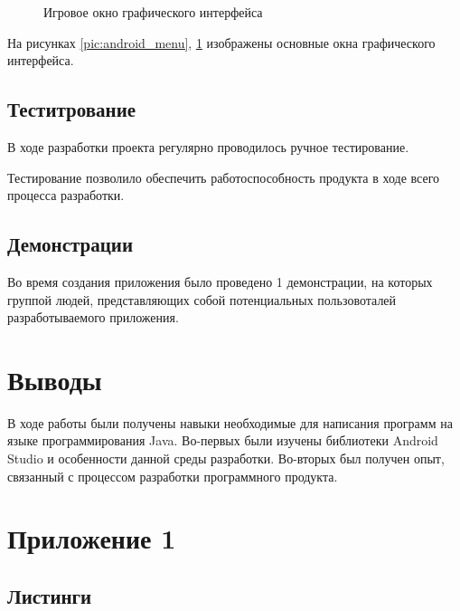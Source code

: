 	\begin{figure}[H]
		\begin{center}
			\caption{Игровое окно графического интерфейса}
			\label{pic:android_screen1}
		\end{center}
	\end{figure} 
	
	На рисунках \ref{pic:android_menu}, \ref{pic:android_screen1} изображены основные окна графического интерфейса. 
	
	\subsection{Теститрование}
	
	В ходе разработки проекта регулярно проводилось ручное тестирование.
	
	Тестирование позволило обеспечить работоспособность продукта в ходе всего процесса разработки. 
	
	\subsection{Демонстрации}
	
	Во время создания приложения было проведено 1 демонстрации, на которых группой людей, представляющих собой потенциальных пользовоталей разработываемого приложения.
	
	\section{Выводы}
	
	В ходе работы были получены навыки необходимые для написания программ на языке программирования Java. Во-первых были изучены библиотеки Android Studio и особенности данной среды разработки. Во-вторых был получен опыт, связанный с процессом разработки программного продукта. 
	
	\section{Приложение 1}
	
	\subsection{Листинги}
	
	
	
